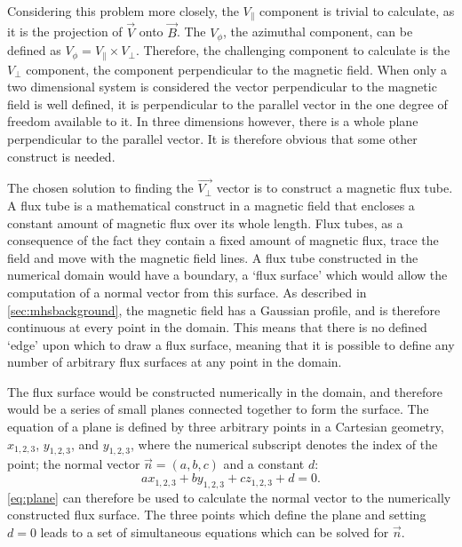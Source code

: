 Considering this problem more closely, the $V_\parallel$ component is trivial to calculate, as it is the projection of $\vec{V}$ onto $\vec{B}$.
The $V_\phi$, the azimuthal component, can be defined as $V_\phi = V_\parallel \times V_\perp$.
Therefore, the challenging component to calculate is the $V_\perp$ component, the component perpendicular to the magnetic field.
When only a two dimensional system is considered the vector perpendicular to the magnetic field is well defined, it is perpendicular to the parallel vector in the one degree of freedom available to it.
In three dimensions however, there is a whole plane perpendicular to the parallel vector.
It is therefore obvious that some other construct is needed.

The chosen solution to finding the $\vec{V_\perp}$ vector is to construct a magnetic flux tube.
A flux tube is a mathematical construct in a magnetic field that encloses a constant amount of magnetic flux over its whole length.
Flux tubes, as a consequence of the fact they contain a fixed amount of magnetic flux, trace the field and move with the magnetic field lines.
A flux tube constructed in the numerical domain would have a boundary, a `flux surface' which would allow the computation of a normal vector from this surface.
As described in \cref{sec:mhsbackground}, the magnetic field has a Gaussian profile, and is therefore continuous at every point in the domain.
This means that there is no defined `edge' upon which to draw a flux surface, meaning that it is possible to define any number of arbitrary flux surfaces at any point in the domain.



The flux surface would be constructed numerically in the domain, and therefore would be a series of small planes connected together to form the surface.
The equation of a plane is defined by three arbitrary points in a Cartesian geometry, $x_{1,2,3}$, $y_{1,2,3}$, and $y_{1,2,3}$, where the numerical subscript denotes the index of the point; the normal vector $\vec{n}=(a,b,c)$ and a constant $d$:
\begin{equation}
	ax_{1,2,3}+by_{1,2,3}+cz_{1,2,3}+d=0.
    \label{eq:plane}
\end{equation}
\cref{eq:plane} can therefore be used to calculate the normal vector to the numerically constructed flux surface.
The three points which define the plane and setting $d=0$ leads to a set of simultaneous equations which can be solved for $\vec{n}$.

